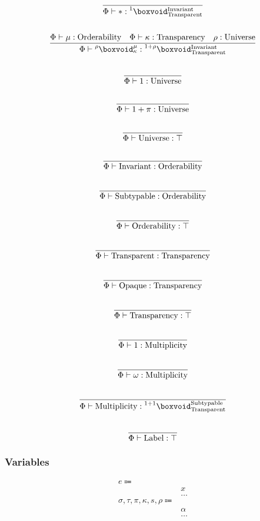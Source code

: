 \documentclass {article}
\begin{document}
\begin{gather*}
\frac
{}
{\Phi \vdash * : \prescript {1} {} \boxvoid^{\text{Invariant}}_{\text{Transparent}}} \\
\\
\frac
{\Phi \vdash \mu : \text{Orderability} \quad \Phi \vdash \kappa : \text{Transparency} \quad \rho : \text{Universe}}
{\Phi \vdash \prescript {\rho} {} \boxvoid^\mu_{\kappa} :
\prescript {1 + \rho} {} \boxvoid^{\text{Invariant}}_{\text{Transparent}}} \\
\\
\frac
{}
{\Phi \vdash 1 : \text{Universe}} \\
\\
\frac
{}
{\Phi \vdash 1 + \pi : \text{Universe}} \\
\\
\frac
{}
{\Phi \vdash \text{Universe} : \top } \\
\\
\frac
{}
{\Phi \vdash \text{Invariant} : \text{Orderability}} \\
\\
\frac
{}
{\Phi \vdash \text{Subtypable} : \text{Orderability}} \\
\\
\frac
{}
{\Phi \vdash \text{Orderability} : \top} \\
\\
\frac
{}
{\Phi \vdash \text{Transparent} : \text{Transparency}} \\
\\
\frac
{}
{\Phi \vdash \text{Opaque} : \text{Transparency}} \\
\\
\frac
{}
{\Phi \vdash \text{Transparency} : \top} \\
\\
\frac
{}
{\Phi \vdash 1 : \text{Multiplicity}} \\
\\
\frac
{}
{\Phi \vdash \omega : \text{Multiplicity}} \\
\\
\frac
{}
{\Phi \vdash \text{Multiplicity} : \prescript{1 + 1} {} \boxvoid^{\text{Subtypable}}_{\text{Transparent}}} \\
\\
\frac
{}
{\Phi \vdash \text{Label} : \top}
\end{gather*}

\subsubsection{Variables}
\begin{align*}
e \Coloneqq & \\
& x \tag{Variable} \\
& \dots \\
\sigma, \tau, \pi, \kappa, s, \rho \Coloneqq & \\
& \alpha \tag{Type Variable} \\
& \dots
\end{align*}
\end{document}
